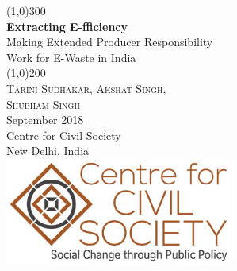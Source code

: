 \documentclass[a4paper, 12pt]{article}
\begin{document}
                    
                    \begin{titlepage}
                    	\begin{center}
                    	\line(1,0){300}\\
                    	[0.25in]
                    	\huge{\bfseries \textcolor{CCSbrown} {Extracting E-fficiency}} \\
    	[0.5cm]
    	\large  {Making Extended Producer Responsibility \\ Work for E-Waste in India} \\
    	
                    	\line(1,0){200}\\
                    	[1in]
                    	\textsc{\huge Tarini Sudhakar, Akshat Singh,\\ Shubham Singh} \\
                    	[1.5cm]
                    	{\Large September 2018} \\
                    	[2.0cm]
                    	{\LARGE Centre for Civil Society} \\
                    	[0.1mm]
                    	{\Large New Delhi, India} \\
    	[2.0cm]
    	 \includegraphics[width = 75mm]{CCSlogo.jpg}
      
                    	\end{center}
                    \end{titlepage}
                    \tableofcontents
                    
                   \newpage
         
\end{document}
